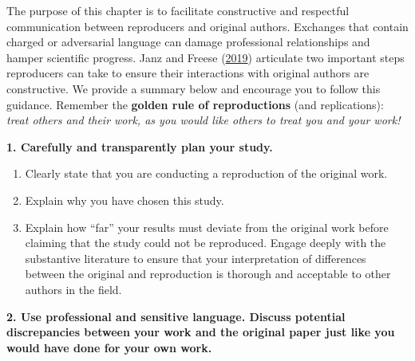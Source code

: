 \documentclass[]{book}
\providecommand{\tightlist}{%
  \setlength{\itemsep}{0pt}\setlength{\parskip}{0pt}}
\begin{document}
The purpose of this chapter is to facilitate constructive and respectful communication between reproducers and original authors. Exchanges that contain charged or adversarial language can damage professional relationships and hamper scientific progress. Janz and Freese (\href{https://www.mzes.uni-mannheim.de/openscience/wp-content/uploads/2019/01/Janz-Freese_-Good-and-Bad-Replications-1.pdf}{2019}) articulate two important steps reproducers can take to ensure their interactions with original authors are constructive. We provide a summary below and encourage you to follow this guidance. Remember the \textbf{golden rule of reproductions} (and replications): \emph{treat others and their work, as you would like others to treat you and your work!}

\textbf{1. Carefully and transparently plan your study.}

\begin{enumerate}
\def\labelenumi{\alph{enumi}.}
\tightlist
\item
  Clearly state that you are conducting a reproduction of the original work.\\
\item
  Explain why you have chosen this study.
\item
  Explain how ``far'' your results must deviate from the original work before claiming that the study could not be reproduced. Engage deeply with the substantive literature to ensure that your interpretation of differences between the original and reproduction is thorough and acceptable to other authors in the field.
\end{enumerate}

\textbf{2. Use professional and sensitive language. Discuss potential discrepancies between your work and the original paper just like you would have done for your own work.}
\end{document}
